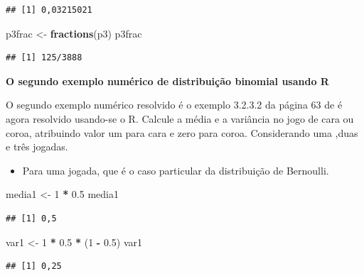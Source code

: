 \documentclass[
]{book}
\newenvironment{Shaded}{\begin{snugshade}}{\end{snugshade}}
\newcommand{\DecValTok}[1]{\textcolor[rgb]{0.00,0.00,0.81}{#1}}
\newcommand{\FloatTok}[1]{\textcolor[rgb]{0.00,0.00,0.81}{#1}}
\newcommand{\KeywordTok}[1]{\textcolor[rgb]{0.13,0.29,0.53}{\textbf{#1}}}
\newcommand{\NormalTok}[1]{#1}
\newcommand{\OperatorTok}[1]{\textcolor[rgb]{0.81,0.36,0.00}{\textbf{#1}}}
\newcommand{\StringTok}[1]{\textcolor[rgb]{0.31,0.60,0.02}{#1}}
\providecommand{\tightlist}{%
  \setlength{\itemsep}{0pt}\setlength{\parskip}{0pt}}
\begin{document}
\begin{verbatim}
## [1] 0,03215021
\end{verbatim}

\begin{Shaded}
\begin{Highlighting}[]
\NormalTok{p3frac <-}\StringTok{ }\KeywordTok{fractions}\NormalTok{(p3)}
\NormalTok{p3frac}
\end{Highlighting}
\end{Shaded}

\begin{verbatim}
## [1] 125/3888
\end{verbatim}

\textbf{O segundo exemplo numérico de distribuição binomial usando R}

O segundo exemplo numérico resolvido é o exemplo 3.2.3.2 da página 63 de \citet{Sartoris2013} é agora resolvido usando-se o R. Calcule a média e a variância
no jogo de cara ou coroa, atribuindo valor um para cara e zero para coroa.
Considerando uma ,duas e três jogadas.

\begin{itemize}
\tightlist
\item
  Para uma jogada, que é o caso particular da distribuição de Bernoulli.
\end{itemize}

\begin{Shaded}
\begin{Highlighting}[]
\NormalTok{media1 <-}\StringTok{ }\DecValTok{1} \OperatorTok{*}\StringTok{ }\FloatTok{0.5}
\NormalTok{media1}
\end{Highlighting}
\end{Shaded}

\begin{verbatim}
## [1] 0,5
\end{verbatim}

\begin{Shaded}
\begin{Highlighting}[]
\NormalTok{var1 <-}\StringTok{ }\DecValTok{1} \OperatorTok{*}\StringTok{ }\FloatTok{0.5} \OperatorTok{*}\StringTok{ }\NormalTok{(}\DecValTok{1} \OperatorTok{-}\StringTok{ }\FloatTok{0.5}\NormalTok{)}
\NormalTok{var1}
\end{Highlighting}
\end{Shaded}

\begin{verbatim}
## [1] 0,25
\end{verbatim}
\end{document}
